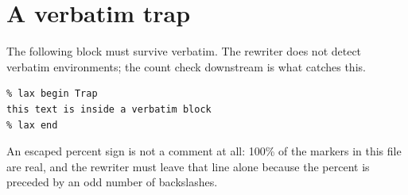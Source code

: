 \documentclass{article}
\theoremstyle{definition}
\begin{document}
\section{A verbatim trap}

The following block must survive verbatim.  The rewriter does not detect
verbatim environments; the count check downstream is what catches this.

\begin{verbatim}
% lax begin Trap
this text is inside a verbatim block
% lax end
\end{verbatim}

An escaped percent sign is not a comment at all: 100\% of the markers in
this file are real, and the rewriter must leave that line alone because the
percent is preceded by an odd number of backslashes.





\end{document}
